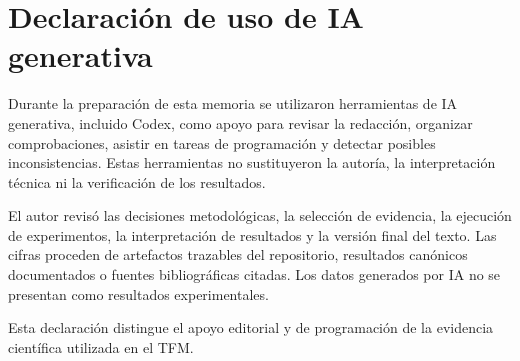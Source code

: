 \section{Declaración de uso de IA generativa}
\label{app:declaracion-ia}

Durante la preparación de esta memoria se utilizaron herramientas de IA generativa, incluido Codex,
como apoyo para revisar la redacción, organizar comprobaciones, asistir en tareas de programación
y detectar posibles inconsistencias. Estas herramientas no sustituyeron la autoría, la
interpretación técnica ni la verificación de los resultados.

El autor revisó las decisiones metodológicas, la selección de evidencia, la ejecución de
experimentos, la interpretación de resultados y la versión final del texto. Las cifras
proceden de artefactos trazables del repositorio, resultados canónicos documentados o
fuentes bibliográficas citadas. Los datos generados por IA no se presentan como resultados
experimentales.

Esta declaración distingue el apoyo editorial y de programación de la evidencia científica
utilizada en el TFM.

